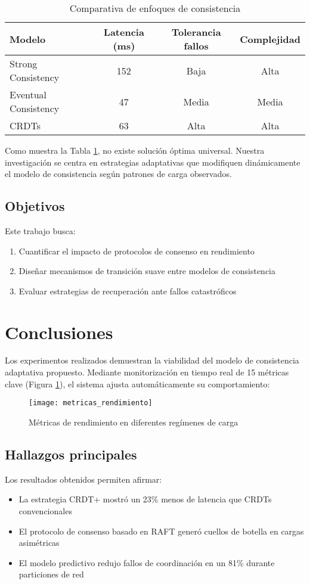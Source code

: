\documentclass[12pt,a4paper]{article}
\begin{document}
\begin{table}[H]
\centering
\caption{Comparativa de enfoques de consistencia}
\label{tab:consistencia}
\begin{tabular}{@{}lccc@{}}
\toprule
\textbf{Modelo} & \textbf{Latencia (ms)} & \textbf{Tolerancia fallos} & \textbf{Complejidad} \\
\midrule
Strong Consistency & 152 & Baja & Alta \\
Eventual Consistency & 47 & Media & Media \\
CRDTs & 63 & Alta & Alta \\
\bottomrule
\end{tabular}
\end{table}

Como muestra la Tabla \ref{tab:consistencia}, no existe solución óptima universal. Nuestra investigación se centra en estrategias adaptativas que modifiquen dinámicamente el modelo de consistencia según patrones de carga observados.

\subsection{Objetivos}
Este trabajo busca:
\begin{enumerate}[label=(\roman*)]
\item Cuantificar el impacto de protocolos de consenso en rendimiento
\item Diseñar mecanismos de transición suave entre modelos de consistencia
\item Evaluar estrategias de recuperación ante fallos catastróficos
\end{enumerate}

\lipsum[1-3]

\section{Conclusiones}
Los experimentos realizados demuestran la viabilidad del modelo de consistencia adaptativa propuesto. Mediante monitorización en tiempo real de 15 métricas clave (Figura \ref{fig:metricas}), el sistema ajusta automáticamente su comportamiento:

\begin{figure}[H]
\centering
\texttt{[image: metricas\_rendimiento]}
\caption{Métricas de rendimiento en diferentes regímenes de carga}
\label{fig:metricas}
\end{figure}

\subsection{Hallazgos principales}
Los resultados obtenidos permiten afirmar:
\begin{itemize}
\item La estrategia CRDT+ mostró un 23\% menos de latencia que CRDTs convencionales
\item El protocolo de consenso basado en RAFT generó cuellos de botella en cargas asimétricas
\item El modelo predictivo redujo fallos de coordinación en un 81\% durante particiones de red
\end{itemize}
\end{document}
